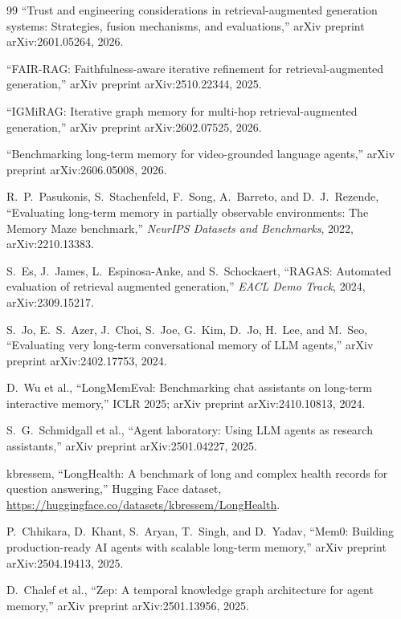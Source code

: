 \documentclass[conference]{IEEEtran}
\begin{document}
\begin{thebibliography}{99}
``Trust and engineering considerations in retrieval-augmented generation systems: Strategies, fusion mechanisms, and evaluations,''
arXiv preprint arXiv:2601.05264, 2026.

``FAIR-RAG: Faithfulness-aware iterative refinement for retrieval-augmented generation,''
arXiv preprint arXiv:2510.22344, 2025.

``IGMiRAG: Iterative graph memory for multi-hop retrieval-augmented generation,''
arXiv preprint arXiv:2602.07525, 2026.

``Benchmarking long-term memory for video-grounded language agents,''
arXiv preprint arXiv:2606.05008, 2026.

R.~P.~Pasukonis, S.~Stachenfeld, F.~Song, A.~Barreto, and D.~J.~Rezende,
``Evaluating long-term memory in partially observable environments: The Memory Maze benchmark,''
\emph{NeurIPS Datasets and Benchmarks}, 2022, arXiv:2210.13383.

S.~Es, J.~James, L.~Espinosa-Anke, and S.~Schockaert,
``RAGAS: Automated evaluation of retrieval augmented generation,''
\emph{EACL Demo Track}, 2024, arXiv:2309.15217.

S.~Jo, E.~S.~Azer, J.~Choi, S.~Joe, G.~Kim, D.~Jo, H.~Lee, and M.~Seo,
``Evaluating very long-term conversational memory of LLM agents,''
arXiv preprint arXiv:2402.17753, 2024.

D.~Wu et al.,
``LongMemEval: Benchmarking chat assistants on long-term interactive memory,''
ICLR 2025; arXiv preprint arXiv:2410.10813, 2024.

S.~G.~Schmidgall et al.,
``Agent laboratory: Using LLM agents as research assistants,''
arXiv preprint arXiv:2501.04227, 2025.

kbressem,
``LongHealth: A benchmark of long and complex health records for question answering,''
Hugging Face dataset, \url{https://huggingface.co/datasets/kbressem/LongHealth}.

P.~Chhikara, D.~Khant, S.~Aryan, T.~Singh, and D.~Yadav,
``Mem0: Building production-ready AI agents with scalable long-term memory,''
arXiv preprint arXiv:2504.19413, 2025.

D.~Chalef et al.,
``Zep: A temporal knowledge graph architecture for agent memory,''
arXiv preprint arXiv:2501.13956, 2025.


\end{thebibliography}
\end{document}
